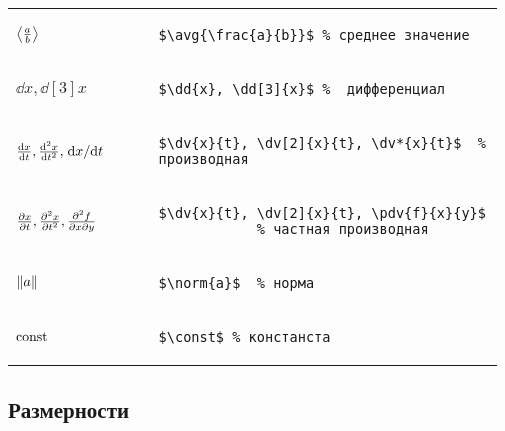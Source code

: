 \noindent
\begin{tabular}{C{0.28\linewidth} C{0.685\linewidth}}
    \vspace{-10pt}$\left\langle {\frac{a}{b}} \right\rangle$ &
        \begin{lstlisting}[style = listtable, gobble = 10]
            $\avg{\frac{a}{b}}$ % среднее значение
        \end{lstlisting} \\
    $\dd{x}, \dd[3]{x}$ &
        \begin{lstlisting}[style = listtable, gobble = 10]
            $\dd{x}, \dd[3]{x}$ %  дифференциал
        \end{lstlisting} \\
    \vspace{-10pt}$\dv{x}{t}, \dv[2]{x}{t}, \dv*{x}{t}$ &
        \begin{lstlisting}[style = listtable, gobble = 10]
            $\dv{x}{t}, \dv[2]{x}{t}, \dv*{x}{t}$  % производная
        \end{lstlisting} \\
    \vspace{-10pt}$\pdv{x}{t}, \pdv[2]{x}{t}, \pdv{f}{x}{y}$ &
        \begin{lstlisting}[style = listtable, gobble = 10]
            $\dv{x}{t}, \dv[2]{x}{t}, \pdv{f}{x}{y}$
            % частная производная
        \end{lstlisting} \\
    $\norm{a}$ &
        \begin{lstlisting}[style = listtable, gobble = 10]
            $\norm{a}$  % норма
        \end{lstlisting} \\
    $\mathrm{const}$ &
        \begin{lstlisting}[style = listtable, gobble = 10]
            $\const$ % констанста
        \end{lstlisting} \\
\end{tabular}



\subsection{Размерности}

